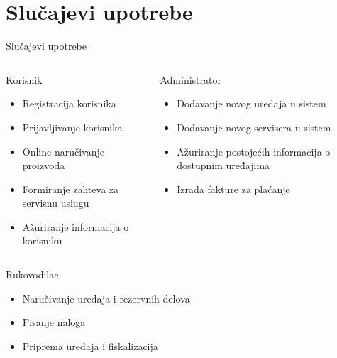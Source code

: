 \documentclass[9pt]{beamer}
\begin{document}
\section{Slučajevi upotrebe}
\begin{frame}{Slučajevi upotrebe}
    \begin{center}
    \begin{columns}
            \begin{alertblock}{Korisnik}
            \begin{itemize}
                \item Registracija korisnika
                \item Prijavljivanje korisnika
                \item Online naručivanje proizvoda
                \item Formiranje zahteva za servisnu uslugu
                \item Ažuriranje informacija o korisniku
            \end{itemize}
            \end{alertblock}
            \begin{alertblock}{Administrator}
            \begin{itemize}
                \item Dodavanje novog uređaja u sistem
                \item Dodavanje novog servisera u sistem
                \item Ažuriranje postojećih informacija o dostupnim uređajima
                \item Izrada fakture za plaćanje
            \end{itemize}
            \end{alertblock}
        \end{columns}
        \begin{columns}
            \begin{alertblock}{Rukovodilac}
            \begin{itemize}
                \item Naručivanje uređaja i rezervnih delova
                \item Pisanje naloga
                \item Priprema uređaja i fiskalizacija
            \end{itemize}
            \end{alertblock}

\end{columns}
\end{center}
\end{frame}
\end{document}
